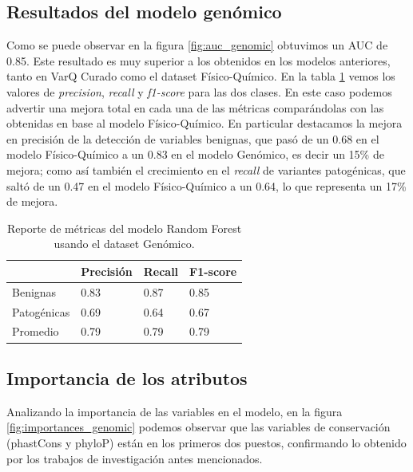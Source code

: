 \subsection{Resultados del modelo genómico}

Como se puede observar en la figura \ref{fig:auc_genomic} obtuvimos un AUC de 0.85. Este resultado es muy superior a los obtenidos en los modelos anteriores, tanto en VarQ Curado como el dataset Físico-Químico. En la tabla \ref{tab:metrics_genomic} vemos los valores de \textit{precision}, \textit{recall} y \textit{f1-score} para las dos clases. En este caso podemos advertir una mejora total en cada una de las métricas comparándolas con las obtenidas en base al modelo Físico-Químico. En particular destacamos la mejora en precisión de la detección de variables benignas, que pasó de un 0.68 en el modelo Físico-Químico a un 0.83 en el modelo Genómico, es decir un 15\% de mejora; como así también el crecimiento en el \textit{recall} de variantes patogénicas, que saltó de un 0.47 en el modelo Físico-Químico a un 0.64, lo que representa un 17\% de mejora.

\begin{table}[H]
\centering
\begin{tabular}{|l|l|l|l|}
\hline
             & Precisión & Recall & F1-score \\ \hline
Benignas     & 0.83      & 0.87   & 0.85     \\ \hline
Patogénicas  & 0.69      & 0.64   & 0.67     \\ \hline
Promedio     & 0.79      & 0.79   & 0.79     \\ \hline
\end{tabular}
\caption{Reporte de métricas del modelo Random Forest usando el dataset Genómico.}
\label{tab:metrics_genomic}
\end{table}



\subsection{Importancia de los atributos}
Analizando la importancia de las variables en el modelo, en la figura \ref{fig:importances_genomic} podemos observar que las variables de conservación (phastCons y phyloP) están en los primeros dos puestos, confirmando lo obtenido por los trabajos de investigación antes mencionados. 

